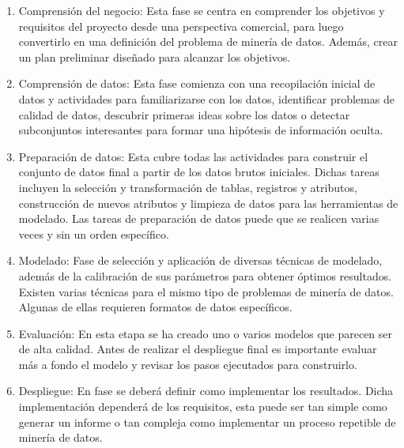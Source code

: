\begin{enumerate}
    \item Comprensión del negocio: Esta fase se centra en comprender los objetivos y requisitos del proyecto desde una perspectiva comercial, para luego convertirlo en una definición del problema de minería de datos. Además, crear un plan preliminar diseñado para alcanzar los objetivos.
    \item Comprensión de datos: Esta fase comienza con una recopilación inicial de datos y actividades para familiarizarse con los datos, identificar problemas de calidad de datos, descubrir primeras ideas sobre los datos o detectar subconjuntos interesantes para formar una hipótesis de información oculta. 
    \item Preparación de datos: Esta cubre todas las actividades para construir el conjunto de datos final a partir de los datos brutos iniciales. Dichas tareas incluyen la selección y transformación de tablas, registros y atributos, construcción de nuevos atributos y limpieza de datos para las herramientas de modelado. Las tareas de preparación de datos puede que se realicen varias veces y sin un orden específico.
    \item Modelado: Fase de selección y aplicación de diversas técnicas de modelado, además de la calibración de sus parámetros para obtener óptimos resultados. Existen varias técnicas para el mismo tipo de problemas de minería de datos. Algunas de ellas requieren formatos de datos específicos.
    \item Evaluación: En esta etapa se ha creado uno o varios modelos que parecen ser de alta calidad. Antes de realizar el despliegue final es importante evaluar más a fondo el modelo y revisar los pasos ejecutados para construirlo.
    \item Despliegue: En fase se deberá definir como implementar los resultados. Dicha implementación dependerá de los requisitos, esta puede ser tan simple como generar un informe o tan compleja como implementar un proceso repetible de minería de datos.
\end{enumerate}